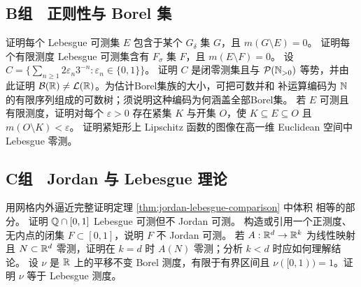 \subsection*{B组　正则性与 Borel 集}
\begin{enumerate}[label=\textbf{\thechapter.\arabic*.},resume]
 证明每个 Lebesgue 可测集 $E$ 包含于某个 $G_\delta$ 集 $G$，且
 $m(G\setminus E)=0$。
 证明每个有限测度 Lebesgue 可测集含有 $F_\sigma$ 集 $F$，且
 $m(E\setminus F)=0$。
 设 $C=\{\sum_{n\ge1}2\varepsilon_n3^{-n}:\varepsilon_n\in\{0,1\}\}$。
 证明 $C$ 是闭零测集且与 $\mathcal P(\mathbb{N}_{>0})$ 等势，并由此证明
 $\mathcal B(\mathbb{R})\ne\mathcal L(\mathbb{R})$。为估计Borel集族的大小，可把可数并和
 补运算编码为 $\mathbb{N}$ 的有限序列组成的可数树；须说明这种编码为何涵盖全部Borel集。
 若 $E$ 可测且有限测度，证明对每个 $\varepsilon>0$ 存在紧集 $K$ 与开集
 $O$，使 $K\subseteq E\subseteq O$ 且 $m(O\setminus K)<\varepsilon$。
 证明紧矩形上 Lipschitz 函数的图像在高一维 Euclidean 空间中 Lebesgue
 零测。
\end{enumerate}

\subsection*{C组　Jordan 与 Lebesgue 理论}
\begin{enumerate}[label=\textbf{\thechapter.\arabic*.},resume]
 用网格内外逼近完整证明定理 \ref{thm:jordan-lebesgue-comparison} 中体积
 相等的部分。
 证明 $\mathbb{Q}\cap[0,1]$ Lebesgue 可测但不 Jordan 可测。
 构造或引用一个正测度、无内点的闭集 $F\subset[0,1]$，说明 $F$ 不
 Jordan 可测。
 若 $A:\mathbb{R}^d\to\mathbb{R}^k$ 为线性映射且 $N\subset\mathbb{R}^d$ 零测，证明在
 $k=d$ 时 $A(N)$ 零测；分析 $k<d$ 时应如何理解结论。
 设 $\nu$ 是 $\mathbb{R}$ 上的平移不变 Borel 测度，有限于有界区间且
 $\nu([0,1))=1$。证明 $\nu$ 等于 Lebesgue 测度。
\end{enumerate}

